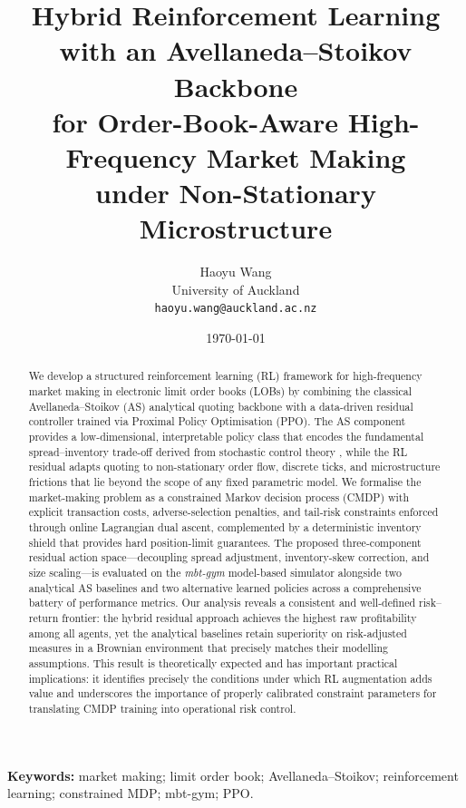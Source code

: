 \documentclass[11pt]{article}
\title{\textbf{Hybrid Reinforcement Learning with an Avellaneda--Stoikov Backbone\\
for Order-Book-Aware High-Frequency Market Making\\
under Non-Stationary Microstructure}}
\author{
  Haoyu Wang \\
  \small University of Auckland \\
  \small \texttt{haoyu.wang@auckland.ac.nz}
}
\date{\today}
\begin{document}
\maketitle

\begin{abstract}
We develop a structured reinforcement learning (RL) framework for
high-frequency market making in electronic limit order books (LOBs) by
combining the classical Avellaneda--Stoikov (AS) analytical quoting
backbone with a data-driven residual controller trained via Proximal
Policy Optimisation (PPO).
The AS component provides a low-dimensional, interpretable policy class
that encodes the fundamental spread--inventory trade-off derived from
stochastic control theory \parencite{avellaneda2008hftlob,gueant2013inventory},
while the RL residual adapts quoting to non-stationary order flow,
discrete ticks, and microstructure frictions that lie beyond the scope
of any fixed parametric model.
We formalise the market-making problem as a constrained Markov decision
process (CMDP) with explicit transaction costs, adverse-selection
penalties, and tail-risk constraints enforced through online Lagrangian
dual ascent, complemented by a deterministic inventory shield that
provides hard position-limit guarantees.
The proposed three-component residual action space---decoupling spread
adjustment, inventory-skew correction, and size scaling---is evaluated
on the \emph{mbt-gym} model-based simulator alongside two analytical AS
baselines and two alternative learned policies across a comprehensive
battery of performance metrics.
Our analysis reveals a consistent and well-defined risk--return frontier:
the hybrid residual approach achieves the highest raw profitability among
all agents, yet the analytical baselines retain superiority on
risk-adjusted measures in a Brownian environment that precisely matches
their modelling assumptions.
This result is theoretically expected and has important practical
implications: it identifies precisely the conditions under which RL
augmentation adds value and underscores the importance of properly
calibrated constraint parameters for translating CMDP training into
operational risk control.
\end{abstract}

\noindent\textbf{Keywords:}
market making; limit order book; Avellaneda--Stoikov;
reinforcement learning; constrained MDP; mbt-gym; PPO.

\end{document}
